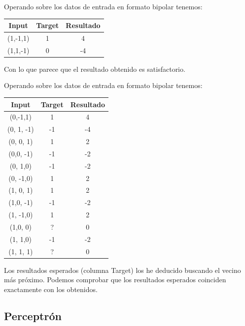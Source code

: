 \begin{problem}[6]
\spart
Operando sobre los datos de entrada en formato bipolar tenemos:
\begin{center}
\begin{tabular}{|c|c|c|}
\hline
\textbf{Input} & \textbf{Target} & \textbf{Resultado} \\
\hline
(1,-1,1) & 1 &  4\\
(1,1,-1) & 0 & -4\\
\hline
\end{tabular}
\end{center}
Con lo que parece que el resultado obtenido es satisfactorio.

\spart
Operando sobre los datos de entrada en formato bipolar tenemos:
\begin{center}
\begin{tabular}{|c|c|c|}
\hline
\textbf{Input} & \textbf{Target} & \textbf{Resultado} \\
\hline
(0,-1,1)   &  1 & 4 \\
(0, 1, -1) & -1 & -4 \\
(0, 0, 1)  &  1 & 2 \\
(0,0, -1)  & -1 & -2\\
(0, 1,0)   & -1 & -2\\
(0, -1,0)  &  1 & 2\\
(1, 0, 1)  &  1 & 2\\
(1,0, -1)  & -1 & -2\\
(1, -1,0)  &  1 & 2\\
(1,0, 0)   &  ? & 0 \\
(1, 1,0)   & -1 & -2\\
(1, 1, 1)  &  ? & 0\\
\hline
\end{tabular}
\end{center}

Los resultados esperados (columna Target) los he deducido buscando el vecino más próximo. Podemos comprobar que los resultados esperados coinciden exactamente con los obtenidos.

\end{problem}

\subsection{Perceptrón}

